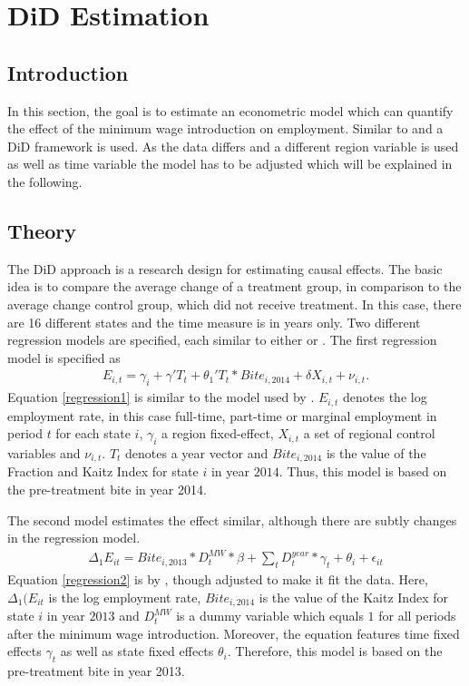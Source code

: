 \documentclass[a4paper]{article}
\begin{document}
{\section{DiD Estimation}
\subsection{Introduction}
In this section, the goal is to estimate an econometric model which can quantify the effect of the minimum wage introduction on employment. Similar to \cite{schmitz2017effects} and \cite{caliendo2017short} a DiD framework is used. As the data differs and a different region variable is used as well as time variable the model has to be adjusted which will be explained in the following. 
\subsection{Theory}
The DiD approach is a research design for estimating causal effects. The basic idea is to compare the average change of a treatment group, in comparison to the average change control group, which did not receive treatment.
In this case, there are 16 different states and the time measure is in years only. Two different regression models are specified, each similar to either \cite{schmitz2017effects} or \cite{caliendo2017short}.
The first regression model is specified as
\begin{align}
\label{regression1}
E_{i, t} = \gamma_i + \gamma{'}T_t  + \theta_1{'}T_t * Bite_{i, 2014} + \delta X_{i,t} + \nu_{i, t}.
\end{align}
Equation \ref{regression1} is similar to the model used by \cite{caliendo2017short}. $E_{i, t}$ denotes the log employment rate, in this case full-time, part-time or marginal employment in period $t$ for each state $i$, $\gamma_i$ a region fixed-effect, $X_{i,t}$ a set of regional control variables and $\nu_{i, t}$. $T_t$ denotes a year vector and $Bite_{i, 2014}$ is the value of the Fraction and Kaitz Index for state $i$ in year $2014$. Thus, this model is based on the pre-treatment bite in year 2014.

The second model estimates the effect similar, although there are subtly changes in the regression model.
\begin{align}
\label{regression2}
\Delta_{1} E_{i t} = Bite_{i, 2013} * D_t^{MW}*\beta + \sum_t D_t^{year} * \gamma_t + \theta_i + \epsilon_{i t}
\end{align}
Equation \ref{regression2} is by \cite{schmitz2017effects}, though adjusted to make it fit the data. Here, $\Delta_{1} (E_{i t}$ is the log employment rate, $Bite_{i, 2014}$ is the value of the Kaitz Index for state $i$ in year $2013$ and $D_t^{MW}$ is a dummy variable which equals $1$ for all periods after the minimum wage introduction. Moreover, the equation features time fixed effects $\gamma_t$ as well as state fixed effects $\theta_i$. Therefore, this model is based on the pre-treatment bite in year 2013.
%
}
\end{document}
